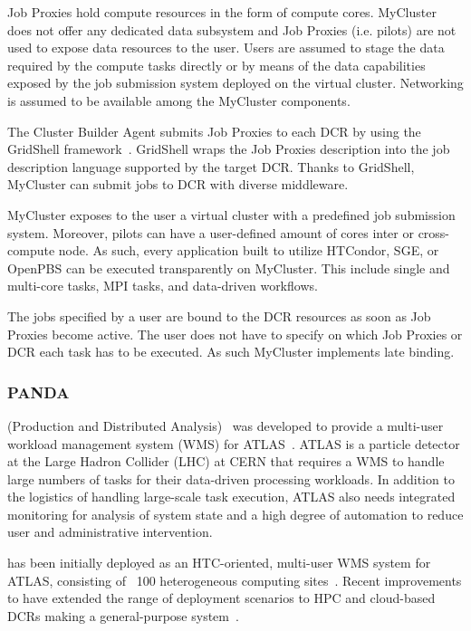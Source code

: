 \documentclass{sig-alternate}
\begin{document}
Job Proxies hold compute resources in the form of compute cores. MyCluster does
not offer any dedicated data subsystem and Job Proxies (i.e. pilots) are not
used to expose data resources to the user. Users are assumed to stage the data
required by the compute tasks directly or by means of the data capabilities
exposed by the job submission system deployed on the virtual cluster. Networking
is assumed to be available among the MyCluster components.

The Cluster Builder Agent submits Job Proxies to each DCR by using the GridShell
framework~\cite{walker2004gridshell}. GridShell wraps the Job Proxies
description into the job description language supported by the target DCR. Thanks to GridShell, MyCluster can submit jobs to DCR with diverse middleware.

MyCluster exposes to the user a virtual cluster with a predefined job submission
system. Moreover, pilots can have a user-defined amount of cores inter or
cross-compute node. As such, every application built to utilize HTCondor, SGE,
or OpenPBS can be executed transparently on MyCluster. This include single and
multi-core tasks, MPI tasks, and data-driven workflows.

The jobs specified by a user are bound to the DCR resources as soon as Job
Proxies become active. The user does not have to specify on which Job Proxies or
DCR each task has to be executed. As such MyCluster implements late binding.

%
\subsubsection{PANDA}
\label{sec:panda}

\panda (Production and Distributed Analysis)~\cite{zhao2011panda} was
developed to provide a multi-user workload management system (WMS) for
ATLAS~\cite{aad2008atlas}. ATLAS is a particle detector at the Large Hadron
Collider (LHC) at CERN that requires a WMS to handle large numbers of tasks for
their data-driven processing workloads. In addition to the logistics of handling
large-scale task execution, ATLAS also needs integrated monitoring for analysis
of system state and a high degree of automation to reduce user and
administrative intervention.

\panda has been initially deployed as an HTC-oriented, multi-user WMS system for
ATLAS, consisting of ~100 heterogeneous computing sites~\cite{maeno2012pd2p}.
Recent improvements to \panda have extended the range of deployment scenarios to
HPC and cloud-based DCRs making \panda a general-purpose \pilot
system~\cite{nilsson2012recentrp}.
\end{document}
